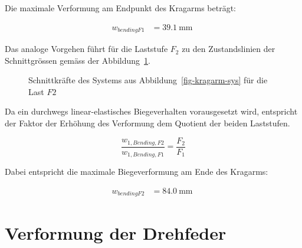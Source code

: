 \documentclass[
  11pt,
  letterpaper,
]{scrreprt}
\begin{document}
Die maximale Verformung am Endpunkt des Kragarms beträgt:

$$
\begin{aligned}
w_{bendingF1} &= 39.1\ \mathrm{mm} \;
\end{aligned}
$$

Das analoge Vorgehen führt für die Laststufe \(F_2\) zu den
Zustandslinien der Schnittgrössen gemäss der
Abbildung~\ref{fig-skkragarmreal_high}.

\begin{figure}[H]


\caption{\label{fig-skkragarmreal_high}Schnittkräfte des Systems aus
Abbildung~\ref{fig-kragarm-sys} für die Last \(F2\)}

\end{figure}%

Da ein durchwegs linear-elastisches Biegeverhalten vorausgesetzt wird,
entspricht der Faktor der Erhöhung des Verformung dem Quotient der
beiden Laststufen.

\[
\frac{w_{1,Bending,F2}}{w_{1,Bending,F1}} = \frac{F_2}{F_1}
\]

Dabei entspricht die maximale Biegeverformung am Ende des Kragarms:

$$
\begin{aligned}
w_{bendingF2} &= 84.0\ \mathrm{mm} \;
\end{aligned}
$$

\section{Verformung der Drehfeder}\label{verformung-der-drehfeder}
\end{document}
